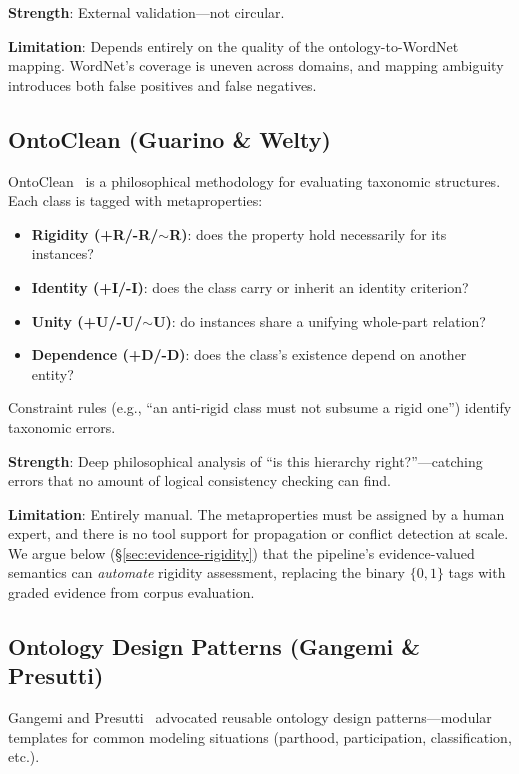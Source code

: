 \documentclass[11pt]{article}
\theoremstyle{definition}
\theoremstyle{plain}
\begin{document}
\textbf{Strength}: External validation---not circular.

\textbf{Limitation}: Depends entirely on the quality of the
ontology-to-WordNet mapping.  WordNet's coverage is uneven across
domains, and mapping ambiguity introduces both false positives and
false negatives.

\subsection{OntoClean (Guarino \& Welty)}

OntoClean~\cite{guarino-welty-ontoclean} is a philosophical methodology
for evaluating taxonomic structures.
Each class is tagged with metaproperties:
\begin{itemize}[nosep]
  \item \textbf{Rigidity (+R/-R/$\sim$R)}: does the property hold
    necessarily for its instances?
  \item \textbf{Identity (+I/-I)}: does the class carry or inherit an
    identity criterion?
  \item \textbf{Unity (+U/-U/$\sim$U)}: do instances share a unifying
    whole-part relation?
  \item \textbf{Dependence (+D/-D)}: does the class's existence depend
    on another entity?
\end{itemize}

Constraint rules (e.g., ``an anti-rigid class must not subsume a rigid
one'') identify taxonomic errors.

\textbf{Strength}: Deep philosophical analysis of ``is this hierarchy
right?''---catching errors that no amount of logical consistency
checking can find.

\textbf{Limitation}: Entirely manual.  The metaproperties must be
assigned by a human expert, and there is no tool support for
propagation or conflict detection at scale.  We argue below
(\S\ref{sec:evidence-rigidity}) that the pipeline's evidence-valued
semantics can \emph{automate} rigidity assessment, replacing the
binary $\{0,1\}$ tags with graded evidence from corpus evaluation.

\subsection{Ontology Design Patterns (Gangemi \& Presutti)}

Gangemi and Presutti~\cite{gangemi-presutti-patterns} advocated
reusable ontology design patterns---modular templates for common
modeling situations (parthood, participation, classification, etc.).
\end{document}
